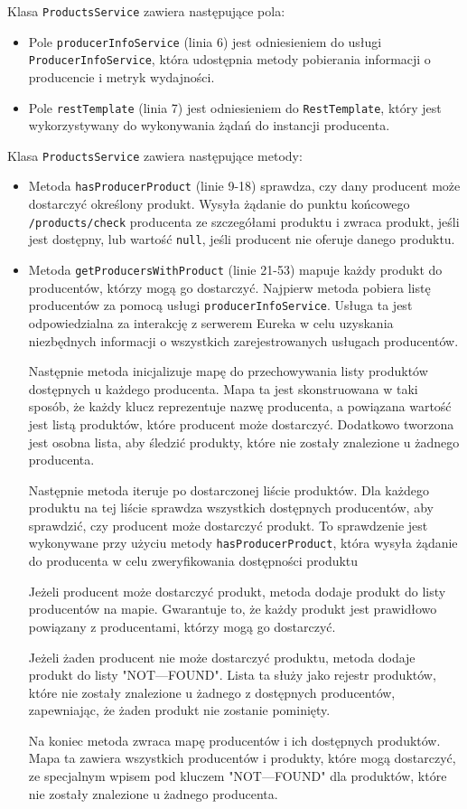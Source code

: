 Klasa \verb|ProductsService| zawiera następujące pola:
\begin{itemize}
    \item Pole \verb|producerInfoService| (linia 6) jest odniesieniem do usługi \verb|ProducerInfoService|, która udostępnia metody pobierania informacji o producencie i metryk wydajności.
    \item Pole \verb|restTemplate| (linia 7) jest odniesieniem do \verb|RestTemplate|, który jest wykorzystywany do wykonywania żądań  do instancji producenta.
\end{itemize}

Klasa \verb|ProductsService| zawiera następujące metody:
\begin{itemize}
    \item Metoda \verb|hasProducerProduct| (linie 9-18) sprawdza, czy dany producent może dostarczyć określony produkt. Wysyła żądanie  do punktu końcowego \verb|/products/check| producenta ze szczegółami produktu i zwraca produkt, jeśli jest dostępny, lub wartość \verb|null|, jeśli producent nie oferuje danego produktu.
    \item Metoda \verb|getProducersWithProduct| (linie 21-53) mapuje każdy produkt do producentów, którzy mogą go dostarczyć.
    Najpierw metoda pobiera listę producentów za pomocą usługi \verb|producerInfoService|. Usługa ta jest odpowiedzialna za interakcję z serwerem Eureka w celu uzyskania niezbędnych informacji o wszystkich zarejestrowanych usługach producentów.

    Następnie metoda inicjalizuje mapę do przechowywania listy produktów dostępnych u każdego producenta. Mapa ta jest skonstruowana w taki sposób, że każdy klucz reprezentuje nazwę producenta, a powiązana wartość jest listą produktów, które producent może dostarczyć. Dodatkowo tworzona jest osobna lista, aby śledzić produkty, które nie zostały znalezione u żadnego producenta.

    Następnie metoda iteruje po dostarczonej liście produktów. Dla każdego produktu na tej liście sprawdza wszystkich dostępnych producentów, aby sprawdzić, czy producent może dostarczyć produkt. To sprawdzenie jest wykonywane przy użyciu metody \verb|hasProducerProduct|, która wysyła żądanie do producenta w celu zweryfikowania dostępności produktu

    Jeżeli producent może dostarczyć produkt, metoda dodaje produkt do listy producentów na mapie. Gwarantuje to, że każdy produkt jest prawidłowo powiązany z producentami, którzy mogą go dostarczyć.

    Jeżeli żaden producent nie może dostarczyć produktu, metoda dodaje produkt do listy "NOT---FOUND". Lista ta służy jako rejestr produktów, które nie zostały znalezione u żadnego z dostępnych producentów, zapewniając, że żaden produkt nie zostanie pominięty.

    Na koniec metoda zwraca mapę producentów i ich dostępnych produktów. Mapa ta zawiera wszystkich producentów i produkty, które mogą dostarczyć, ze specjalnym wpisem pod kluczem "NOT---FOUND" dla produktów, które nie zostały znalezione u żadnego producenta.
\end{itemize}

